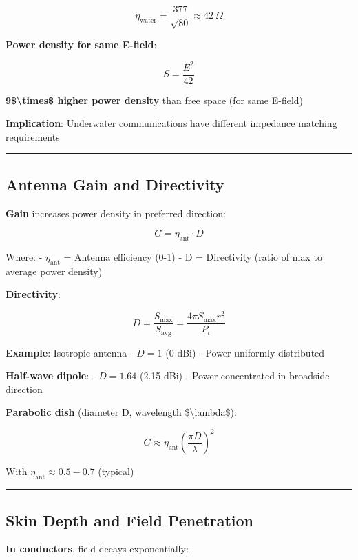 \[
\eta_{\text{water}} = \frac{377}{\sqrt{80}} \approx 42\ \Omega
\]

\textbf{Power density for same E-field}:

\[
S = \frac{E^2}{42}
\]

\textbf{9\$\textbackslash times\$ higher power density} than free space
(for same E-field)

\textbf{Implication}: Underwater communications have different impedance
matching requirements

\begin{center}\rule{0.5\linewidth}{0.5pt}\end{center}

\subsection{Antenna Gain and
Directivity}\label{antenna-gain-and-directivity}

\textbf{Gain} increases power density in preferred direction:

\[
G = \eta_{\text{ant}} \cdot D
\]

Where: - \(\eta_{\text{ant}}\) = Antenna efficiency (0-1) - D =
Directivity (ratio of max to average power density)

\textbf{Directivity}:

\[
D = \frac{S_{\text{max}}}{S_{\text{avg}}} = \frac{4\pi S_{\text{max}} r^2}{P_t}
\]

\textbf{Example}: Isotropic antenna - \(D = 1\) (0 dBi) - Power
uniformly distributed

\textbf{Half-wave dipole}: - \(D = 1.64\) (2.15 dBi) - Power
concentrated in broadside direction

\textbf{Parabolic dish} (diameter D, wavelength
\$\textbackslash lambda\$):

\[
G \approx \eta_{\text{ant}} \left(\frac{\pi D}{\lambda}\right)^2
\]

With \(\eta_{\text{ant}} \approx 0.5-0.7\) (typical)

\begin{center}\rule{0.5\linewidth}{0.5pt}\end{center}

\subsection{Skin Depth and Field
Penetration}\label{skin-depth-and-field-penetration}

\textbf{In conductors}, field decays exponentially:

